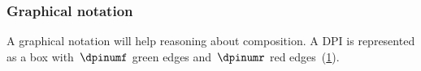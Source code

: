 \begin{example}
    \begin{comment}

        \begin{table}[tbh]
            \begin{center}
                \begin{tabular}{cccc}
                    Technology & Specific energy [\unitfrac[]{J}{kg}] & Specific cost [\unitfrac[]{J}{\stdcurr}]
                    & Life [\# cycles]
                    \\
                    \hline
                    $\mathsf{NiMH}$  & 100.0 & 3.41 & 500    \\
                    $\mathsf{NiH2}$  & 45.0  & 10.5 & 20,000 \\
                    $\mathsf{LCO}$   & 195.0 & 2.84 & 750    \\
                    $\mathsf{LMO}$   & 150.0 & 2.84 & 500    \\
                    $\mathsf{NiCad}$ & 30.0  & 7.50 & 500    \\
                    $\mathsf{SLA}$   & 30.0  & 7.00 & 500    \\
                    $\mathsf{LiPo}$  & 250.0 & 2.50 & 600    \\
                    $\mathsf{LFP}$   & 90.0  & 1.50 & 1,500
                \end{tabular}
            \end{center}
            \caption{Specifications of common battery technologies~\cite{censi2015}. }
            \label{tab:battery}
        \end{table}
    \end{comment}

\end{example}




\FloatBarrier

\subsubsection{Graphical notation}

A graphical notation will help reasoning about composition. A DPI is represented as a box with~$\dpinumf$ green edges and~$\dpinumr$ red edges~(\cref{fig:dp_graphical}).

\begin{figure}[h]
    \centering
    \caption{\label{fig:dp_graphical}}
\end{figure}

